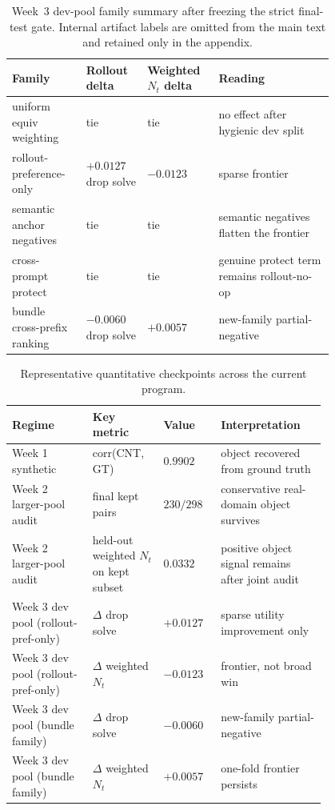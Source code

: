 \begin{table}[t]
  \centering
  \small
  \begin{tabular}{p{0.19\linewidth} p{0.16\linewidth} p{0.14\linewidth} p{0.31\linewidth}}
    \toprule
    Family & Rollout delta & Weighted $N_t$ delta & Reading \\
    \midrule
    uniform equiv weighting & tie & tie & no effect after hygienic dev split \\
    rollout-preference-only & $+0.0127$ drop solve & $-0.0123$ & sparse frontier \\
    semantic anchor negatives & tie & tie & semantic negatives flatten the frontier \\
    cross-prompt protect & tie & tie & genuine protect term remains rollout-no-op \\
    bundle cross-prefix ranking & $-0.0060$ drop solve & $+0.0057$ & new-family partial-negative \\
    \bottomrule
  \end{tabular}
  \caption{Week~3 dev-pool family summary after freezing the strict final-test gate. Internal artifact labels are omitted from the main text and retained only in the appendix.}
  \label{tab:signal-summary}
\end{table}

\begin{table}[t]
  \centering
  \small
  \begin{tabular}{p{0.22\linewidth} p{0.16\linewidth} p{0.12\linewidth} p{0.28\linewidth}}
    \toprule
    Regime & Key metric & Value & Interpretation \\
    \midrule
    Week 1 synthetic & corr(CNT, GT) & $0.9902$ & object recovered from ground truth \\
    Week 2 larger-pool audit & final kept pairs & $230 / 298$ & conservative real-domain object survives \\
    Week 2 larger-pool audit & held-out weighted $N_t$ on kept subset & $0.0332$ & positive object signal remains after joint audit \\
    Week 3 dev pool (rollout-pref-only) & $\Delta$ drop solve & $+0.0127$ & sparse utility improvement only \\
    Week 3 dev pool (rollout-pref-only) & $\Delta$ weighted $N_t$ & $-0.0123$ & frontier, not broad win \\
    Week 3 dev pool (bundle family) & $\Delta$ drop solve & $-0.0060$ & new-family partial-negative \\
    Week 3 dev pool (bundle family) & $\Delta$ weighted $N_t$ & $+0.0057$ & one-fold frontier persists \\
    \bottomrule
  \end{tabular}
  \caption{Representative quantitative checkpoints across the current program.}
  \label{tab:keynumbers}
\end{table}


